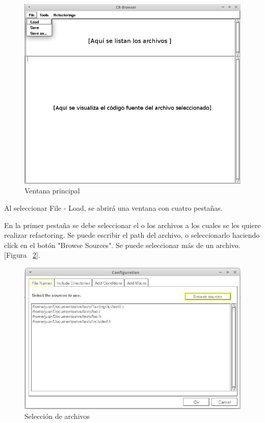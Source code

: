 \documentclass[a4paper,oneside,12pt]{article}
\begin{document}
\begin{figure}[h!]
  \centering
    \includegraphics[scale=0.50]{images/uso/inicio.jpg}
     \caption{Ventana principal}
     \label{inicio}
\end{figure}

Al seleccionar File - Load, se abrirá una ventana con cuatro pestañas. 

En la primer pestaña se debe seleccionar el o los archivos a los cuales se les quiere realizar refactoring. Se puede escribir el path del archivo, o seleccionarlo haciendo click en el botón "Browse Sources". Se puede seleccionar más de un archivo. [Figura ~\ref{file_names}].

\begin{figure}[h!]
  \centering
    \includegraphics[scale=0.50]{images/uso/file_names.jpg}
     \caption{Selecci\'on de archivos}
     \label{file_names}
\end{figure}
\end{document}

